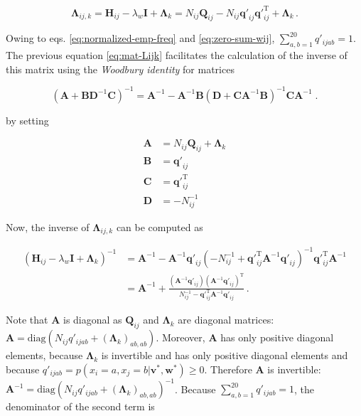 \documentclass[11pt,a4paper,twoside]{book}
\newcommand{\eq}{\!=\!}
\renewcommand{\H}{\mathbf{H}}
\newcommand{\I}{\mathbf{I}}
\newcommand{\Lijk}{\mathbf{\Lambda}_{ij,k}}
\newcommand{\Lk}{\mathbf{\Lambda}_k}
\newcommand{\Qij}{\mathbf{Q}_{ij}}
\newcommand{\qij}{\mathbf{q\prime}_{ij}}
\renewcommand{\v}{\mathbf{v}}
\newcommand{\w}{\mathbf{w}}
\theoremstyle{definition}
\theoremstyle{definition}
\theoremstyle{remark}
\begin{document}
\begin{equation}
     \Lijk = \H_{ij} - \lambda_w \I + \Lk = N_{ij} \Qij- N_{ij} \qij \qij^{\mathrm{T}} + \Lk \,.
\label{eq:mat-Lijk}
\end{equation}

Owing to eqs. \eqref{eq:normalized-emp-freq} and \eqref{eq:zero-sum-wij},
\(\sum_{a,b=1}^{20} q'_{ijab} = 1\). The previous equation
\eqref{eq:mat-Lijk} facilitates the calculation of the inverse of this
matrix using the \emph{Woodbury identity} for matrices

\begin{equation}
    (\mathbf{A} + \mathbf{B} \mathbf{D}^{-1} \mathbf{C})^{-1} = \mathbf{A}^{-1} - \mathbf{A}^{-1} \mathbf{B} (\mathbf{D} + \mathbf{C} \mathbf{A}^{-1} \mathbf{B}) ^{-1} \mathbf{C} \mathbf{A}^{-1} \;. 
\end{equation}

by setting

\begin{align}
  \mathbf{A} &= N_{ij} \Qij + \Lk \nonumber\\
  \mathbf{B} &= \qij \nonumber\\
  \mathbf{C} &= \qij^\mathrm{T} \nonumber\\
  \mathbf{D} &=- N_{ij}^{-1} \nonumber
\end{align}

Now, the inverse of \(\Lijk\) can be computed as

\begin{align}
      \left( \H_{ij} - \lambda_w \I + \Lk \right)^{-1} & = \mathbf{A}^{-1} - \mathbf{A}^{-1} \qij  \left( -N_{ij}^{-1}  + \qij^\mathrm{T} \mathbf{A}^{-1} \qij \right)^{-1}  \qij^\mathrm{T} \mathbf{A}^{-1} \nonumber\\
     & = \mathbf{A}^{-1} + \frac{ (\mathbf{A}^{-1} \qij) (\mathbf{A}^{-1} \qij)^{\mathrm{T}} }{ N_{ij}^{-1} - \qij^\mathrm{T} \mathbf{A}^{-1} \qij} \,.
\label{eq:fast-inverse-mat-Lijk}
\end{align}

Note that \(\mathbf{A}\) is diagonal as \(\Qij\) and \(\Lk\) are
diagonal matrices:
\(\mathbf{A} = \text{diag}(N_{ij} q'_{ijab} + (\Lk)_{ab,ab})\).
Moreover, \(\mathbf{A}\) has only positive diagonal elements, because
\(\Lk\) is invertible and has only positive diagonal elements and
because \(q'_{ijab} = p(x_i \eq a, x_j \eq b | \v^*,\w^*) \ge 0\).
Therefore \(\mathbf{A}\) is invertible:
\(\mathbf{A}^{-1} = \text{diag}(N_{ij} q'_{ijab} + (\Lk)_{ab,ab} )^{-1}\).
Because \(\sum_{a,b=1}^{20} q'_{ijab} = 1\), the denominator of the
second term is
\end{document}
